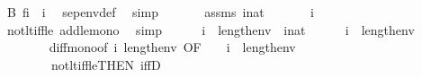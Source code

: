 \begin{isabellebody}
\ B{\isacharcolon}{\kern0pt}\ {\isachardoublequoteopen}{\isacharquery}{\kern0pt}f{\isacharbackquote}{\kern0pt}i\ {\isacharequal}{\kern0pt}\ i{\isacharhash}{\kern0pt}{\isacharplus}{\kern0pt}{}{\isachardoublequoteclose}\ \isamarkupfalse%
\ sep{\isacharunderscore}{\kern0pt}env{\isacharunderscore}{\kern0pt}def\ \isamarkupfalse%
\ simp\isanewline
\ \ \ \ \isamarkupfalse%
\ {}\ assms{\isacharparenleft}{\kern0pt}{}{\isacharparenright}{\kern0pt}\ {\isacartoucheopen}i{\isasymin}nat{\isacartoucheclose}\isanewline
\ \ \ \ \isamarkupfalse%
\ {\isachardoublequoteopen}{\isasymnot}\ i{\isacharhash}{\kern0pt}{\isacharplus}{\kern0pt}{}\ {\isacharless}{\kern0pt}\ {}{\isachardoublequoteclose}\ \isamarkupfalse%
\ not{\isacharunderscore}{\kern0pt}lt{\isacharunderscore}{\kern0pt}iff{\isacharunderscore}{\kern0pt}le\ add{\isacharunderscore}{\kern0pt}le{\isacharunderscore}{\kern0pt}mono\ \isamarkupfalse%
\ simp\isanewline
\ \ \ \ \isamarkupfalse%
\ {\isacartoucheopen}i\ {\isacharless}{\kern0pt}\ {}{\isacharhash}{\kern0pt}{\isacharplus}{\kern0pt}length{\isacharparenleft}{\kern0pt}env{\isacharparenright}{\kern0pt}{\isacartoucheclose}\ {}\ {\isacartoucheopen}i{\isasymin}nat{\isacartoucheclose}\isanewline
\ \ \ \ \isamarkupfalse%
\ {\isachardoublequoteopen}i{\isacharhash}{\kern0pt}{\isacharminus}{\kern0pt}{}\ {\isacharless}{\kern0pt}\ {}{\isacharhash}{\kern0pt}{\isacharplus}{\kern0pt}length{\isacharparenleft}{\kern0pt}env{\isacharparenright}{\kern0pt}\ {\isacharhash}{\kern0pt}{\isacharminus}{\kern0pt}\ {}{\isachardoublequoteclose}\ \isanewline
\ \ \ \ \ \ \isamarkupfalse%
\ diff{\isacharunderscore}{\kern0pt}mono{\isacharbrackleft}{\kern0pt}of\ i\ {\isachardoublequoteopen}{}{\isacharhash}{\kern0pt}{\isacharplus}{\kern0pt}length{\isacharparenleft}{\kern0pt}env{\isacharparenright}{\kern0pt}{\isachardoublequoteclose}\ {}{\isacharcomma}{\kern0pt}OF\ {\isacharunderscore}{\kern0pt}\ {\isacharunderscore}{\kern0pt}\ {\isacharunderscore}{\kern0pt}\ {\isacartoucheopen}i\ {\isacharless}{\kern0pt}\ {}{\isacharhash}{\kern0pt}{\isacharplus}{\kern0pt}length{\isacharparenleft}{\kern0pt}env{\isacharparenright}{\kern0pt}{\isacartoucheclose}{\isacharbrackright}{\kern0pt}\ \isanewline
\ \ \ \ \ \ \ \ not{\isacharunderscore}{\kern0pt}lt{\isacharunderscore}{\kern0pt}iff{\isacharunderscore}{\kern0pt}le{\isacharbrackleft}{\kern0pt}THEN\ iffD{}{\isacharbrackright}{\kern0pt}\ \isamarkupfalse%

\end{isabellebody}
